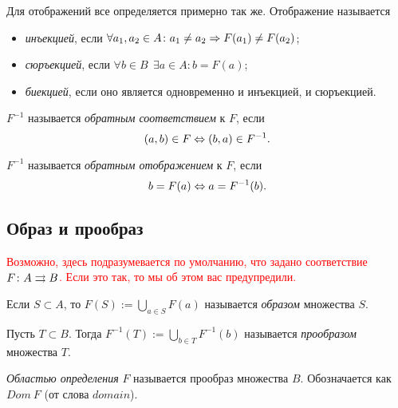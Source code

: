 
Для отображений все определяется примерно так же. Отображение называется
\begin{itemize}
	\item \textit{инъекцией}, если $\forall a_1, a_2 \in A \colon a_1 \neq a_2 \Rightarrow F(a_1) \neq F(a_2)$;
	\item \textit{сюръекцией}, если $\forall b \in B\ \ \exists a \in A \colon b = F(a)$;
	\item \textit{биекцией}, если оно является одновременно и инъекцией, и сюръекцией.
\end{itemize}

\begin{definition}
	$F^{-1}$ называется \textit{обратным соответствием} к $F$, если
	$$
		(a, b) \in F \Leftrightarrow (b, a) \in F^{-1}.
	$$
\end{definition}

\begin{definition}
		$F^{-1}$ называется \textit{обратным отображением} к $F$, если
	$$
		b = F(a) \Leftrightarrow a = F^{-1}(b).
	$$
\end{definition}

\subsection{Образ и прообраз}

\textcolor{red}{Возможно, здесь подразумевается по умолчанию, что задано 
соответствие $F \colon A \rightrightarrows B$. Если это так, то мы об этом вас предупредили.}

\begin{definition}
	Если $S \subset A$, то $F(S) := \bigcup\limits_{a \in S} F(a)$ называется \textit{образом} множества $S$.
\end{definition}

\begin{definition}
	Пусть $T \subset B$. Тогда $F^{-1}(T) := \bigcup\limits_{b \in T} F^{-1}(b)$ называется \textit{прообразом} множества $T$.
\end{definition}

\begin{definition}
	\textit{Областью определения} $F$ называется прообраз множества $B$. Обозначается как $Dom\ F$ (от слова $domain$).
\end{definition}


